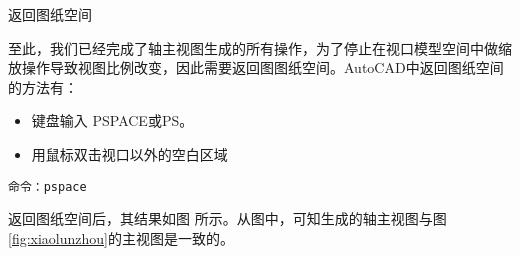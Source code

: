 \begin{procedure}
\begin{figure}[htbp]
\centering
\begin{floatrow}[2]
\end{floatrow}
\end{figure}
\begin{figure}[htbp]
\centering
\begin{floatrow}[2]
\end{floatrow}
\end{figure}


\item 返回图纸空间

至此，我们已经完成了轴主视图生成的所有操作，为了停止在视口模型空间中做缩放操作导致视图比例改变，因此需要返回图图纸空间。AutoCAD中返回图纸空间的方法有：
\begin{itemize}
\item 键盘输入 PSPACE或PS。
\item 用鼠标双击视口以外的空白区域
\end{itemize}
\begin{lstlisting}
命令：pspace
\end{lstlisting}

返回图纸空间后，其结果如图 所示。从图中，可知生成的轴主视图与图\ref{fig:xiaolunzhou}的主视图是一致的。

\end{procedure}

\endinput